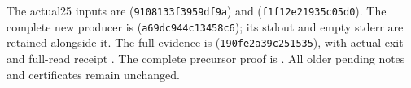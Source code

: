 {\footnotesize\raggedright
The actual25 inputs are
(\texttt{9108133f3959df9a}) and
(\texttt{f1f12e21935c05d0}).
The complete new producer is
(\texttt{a69dc944c13458c6}); its stdout and empty stderr are retained
alongside it. The full evidence is
(\texttt{190fe2a39c251535}), with actual-exit and full-read receipt
.
The complete precursor proof is
.
All older pending notes and certificates remain unchanged.\par}
